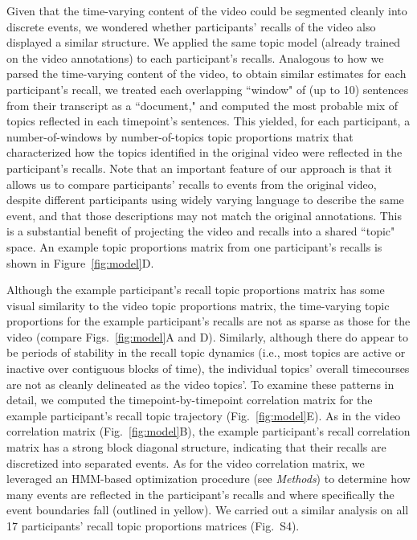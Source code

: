 \documentclass{article}
\newcommand{\corrmats}{S4}
\begin{document}
Given that the time-varying content of the video could be segmented cleanly into discrete events, we wondered whether participants' recalls of the video also displayed a similar structure.  We applied the same topic model (already trained on the video annotations) to each participant's recalls.  Analogous to how we parsed the time-varying content of the video, to obtain similar estimates for each participant's recall, we treated each overlapping  ``window" of (up to 10) sentences from their transcript as a ``document," and computed the most probable mix of topics reflected in each timepoint's sentences.  This yielded, for each participant, a number-of-windows by number-of-topics topic proportions matrix that characterized how the topics identified in the original video were reflected in the participant's recalls.  Note that an important feature of our approach is that it allows us to compare participants' recalls to events from the original video, despite different participants using widely varying language to describe the same event, and that those descriptions may not match the original annotations.  This is a substantial benefit of projecting the video and recalls into a shared ``topic" space.  An example topic proportions matrix from one participant's recalls is shown in Figure~\ref{fig:model}D.

Although the example participant's recall topic proportions matrix has some visual similarity to the video topic proportions matrix, the time-varying topic proportions for the example participant's recalls are not as sparse as those for the video (compare Figs.~\ref{fig:model}A and D).  Similarly, although there do appear to be periods of stability in the recall topic dynamics (i.e., most topics are active or inactive over contiguous blocks of time), the individual topics' overall timecourses are not as cleanly delineated as the video topics'.  To examine these patterns in detail, we computed the timepoint-by-timepoint correlation matrix for the example participant's recall topic trajectory (Fig.~\ref{fig:model}E).  As in the video correlation matrix (Fig.~\ref{fig:model}B), the example participant's recall correlation matrix has a strong block diagonal structure, indicating that their recalls are discretized into separated events.  As for the video correlation matrix, we leveraged an HMM-based optimization procedure (see \textit{Methods}) to determine how many events are reflected in the participant's recalls and where specifically the event boundaries fall (outlined in yellow).  We carried out a similar analysis on all 17 participants' recall topic proportions matrices (Fig.~\corrmats).
\end{document}
